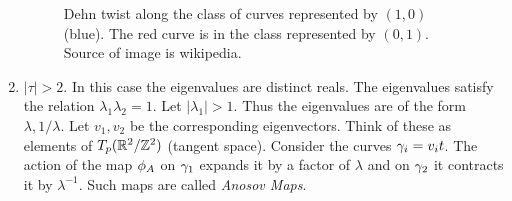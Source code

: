 \begin{enumerate}
\begin{figure}
      \caption{Dehn twist along the class of curves represented by $(1,0)$ (blue). The red curve is in the class represented by $(0,1)$. Source of image is wikipedia.}
    \end{figure}
  \item $|\tau| > 2 $. In this case the eigenvalues are distinct reals. The eigenvalues satisfy the relation $\lambda_1\lambda_2 = 1$. Let $|\lambda_1|> 1$. Thus the eigenvalues are of the form $\lambda, 1/\lambda$. Let $v_1,v_2$ be the corresponding eigenvectors. Think of these as elements of $T_{p}(\mathbb{R}^2/\mathbb{Z}^2)$ (tangent space). Consider the curves $\gamma_i = v_i t $. The action of the map $\phi_A$ on $\gamma_1$ expands it by a factor of $\lambda$ and on $\gamma_2$ it contracts it by $\lambda^{-1}$. Such maps are called \textit{Anosov Maps}.
\end{enumerate}
